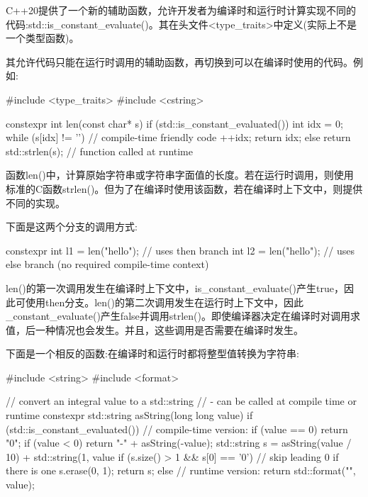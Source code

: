 
C++20提供了一个新的辅助函数，允许开发者为编译时和运行时计算实现不同的代码:std::is\_constant\_evaluate()。其在头文件<type\_traits>中定义(实际上不是一个类型函数)。

其允许代码只能在运行时调用的辅助函数，再切换到可以在编译时使用的代码。例如:


\begin{cpp}
#include <type_traits>
#include <cstring>

constexpr int len(const char* s)
{
	if (std::is_constant_evaluated()) {
		int idx = 0;
		while (s[idx] != '\0') { // compile-time friendly code
			++idx;
		}
		return idx;
	}
	else {
		return std::strlen(s); // function called at runtime
	}
}
\end{cpp}

函数len()中，计算原始字符串或字符串字面值的长度。若在运行时调用，则使用标准的C函数strlen()。但为了在编译时使用该函数，若在编译时上下文中，则提供不同的实现。

下面是这两个分支的调用方式:

\begin{cpp}
constexpr int l1 = len("hello"); // uses then branch
int l2 = len("hello"); // uses else branch (no required compile-time context)
\end{cpp}

len()的第一次调用发生在编译时上下文中，is\_constant\_evaluate()产生true，因此可使用then分支。len()的第二次调用发生在运行时上下文中，因此\_constant\_evaluate()产生false并调用strlen()。即使编译器决定在编译时对调用求值，后一种情况也会发生。并且，这些调用是否需要在编译时发生。

下面是一个相反的函数:在编译时和运行时都将整型值转换为字符串:


\begin{cpp}
#include <string>
#include <format>

// convert an integral value to a std::string
// - can be called at compile time or runtime
constexpr std::string asString(long long value)
{
	if (std::is_constant_evaluated()) {
		// compile-time version:
		if (value == 0) {
			return "0";
		}
		if (value < 0) {
			return "-" + asString(-value);
		}
		std::string s = asString(value / 10) + std::string(1, value %
		if (s.size() > 1 && s[0] == '0') { // skip leading 0 if there is one
			s.erase(0, 1);
		}
		return s;
	}
	else {
		// runtime version:
		return std::format("{}", value);
	}
}
\end{cpp}

